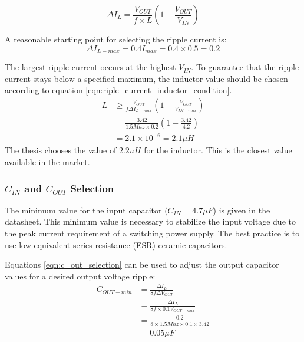 \documentclass[\main/main.tex]{subfiles}
\begin{document}
\begin{equation}
    \Delta I_{L} = \frac{V_{OUT}}{f\times L} \left(1 - \frac{V_{OUT}}{V_{IN}}\right)
    \label{eqn:riple_current_vs_in_out_inductance}
\end{equation}

A reasonable starting point for selecting the ripple current
is:
\begin{equation}
    \Delta I_{L-max} = 0.4 I_{max} = 0.4 \times 0.5 = 0.2
\end{equation}

The largest ripple current occurs at the highest $V_{IN}$. To guarantee that the ripple current stays below a specified maximum, the inductor value should be chosen according to equation \ref{eqn:riple_current_inductor_condition}.
\begin{equation}
    \begin{split}
        L &\geq \frac{V_{OUT}}{f\Delta I_{L-max}} \left( 1 - \frac{V_{OUT}}{V_{IN-max}}\right)  \\
        &= \frac{3.42}{1.5Mhz \times 0.2} \left( 1 - \frac{3.42}{4.2}\right) \\
        &= 2.1 \times 10^{-6} = 2.1 \mu H
    \end{split}
    \label{eqn:riple_current_inductor_condition}
\end{equation}
The thesis chooses the value of $2.2uH$ for the inductor. This is the closest value available in the market.

\subsubsection{$C_{IN}$ and $C_{OUT}$ Selection}
The minimum value for the input capacitor ($C_{IN} = 4.7 \mu F$) is given in the datasheet. This minimum value is necessary to stabilize the input voltage due to the peak current requirement of a switching power supply.
The best practice is to use low-equivalent series resistance (ESR) ceramic capacitors. 

Equations \ref{eqn:c_out_selection} can be used to adjust the output capacitor values for a desired output voltage ripple:
\begin{equation}
    \begin{split}
        C_{OUT-min} &= \frac{\Delta I_{L}}{8f\Delta V_{OUT}} \\
        &= \frac{\Delta I_{L}}{8f \times 0.1V_{OUT-max}} \\
        &= \frac{0.2}{8 \times 1.5Mhz \times 0.1 \times 3.42} \\
        &= 0.05 \mu F
    \end{split}
    \label{eqn:c_out_selection}
\end{equation}
\end{document}
